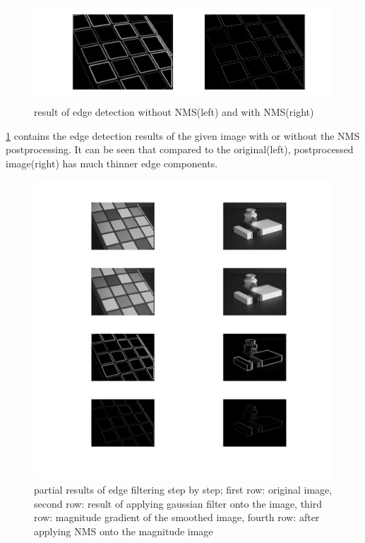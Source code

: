 \documentclass[extendedabs]{bmvc2k}
\begin{document}
\begin{figure}[h]
    \centering
    \includegraphics[width=\linewidth]{hw4_1_2}
    \caption{result of edge detection without NMS(left) and with NMS(right)}
    \label{fig:2}
\end{figure}

\figurename{\ref{fig:2}} contains the edge detection results of the given image with or without the NMS postprocessing.
It can be seen that compared to the original(left), postprocessed image(right) has much thinner edge components.

\begin{figure}[h]
    \centering
    \includegraphics[width=\linewidth]{hw4_1_3}
    \caption{partial results of edge filtering step by step; first row: original image, second row:
    result of applying gaussian filter onto the image, third row: magnitude gradient of the smoothed image,
    fourth row: after applying NMS onto the magnitude image}
    \label{fig:10}
\end{figure}
\end{document}
